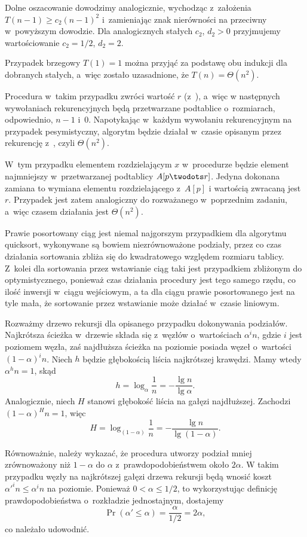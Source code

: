 Dolne oszacowanie dowodzimy analogicznie, wychodząc z~założenia $T(n-1)\ge c_2(n-1)^2$ i~zamieniając znak nierówności na przeciwny w~powyższym dowodzie. Dla analogicznych stałych $c_2$, $d_2>0$ przyjmujemy wartościowanie $c_2=1/2$, $d_2=2$.

Przypadek brzegowy $T(1)=1$ można przyjąć za podstawę obu indukcji dla dobranych stałych, a~więc zostało uzasadnione, że $T(n)=\Theta(n^2)$.

\exercise %
Procedura  w~takim przypadku zwróci wartość $r$ (z~), a~więc w następnych wywołaniach rekurencyjnych będą przetwarzane podtablice o~rozmiarach, odpowiednio, $n-1$ i~0. Napotykając w~każdym wywołaniu rekurencyjnym na przypadek pesymistyczny, algorytm będzie działał w~czasie opisanym przez rekurencję z~, czyli $\Theta(n^2)$.

\exercise %
W~tym przypadku elementem rozdzielającym $x$ w~procedurze  będzie element najmniejszy w~przetwarzanej podtablicy $A[p\twodots r]$. Jedyna dokonana zamiana to wymiana elementu rozdzielającego z~$A[p]$ i wartością zwracaną jest $r$. Przypadek jest zatem analogiczny do rozważanego w~poprzednim zadaniu, a~więc czasem działania  jest $\Theta(n^2)$.

\exercise %
Prawie posortowany ciąg jest niemal najgorszym przypadkiem dla algorytmu quicksort, wykonywane są bowiem niezrównoważone podziały, przez co czas działania sortowania zbliża się do kwadratowego względem rozmiaru tablicy. Z~kolei dla sortowania przez wstawianie ciąg taki jest przypadkiem zbliżonym do optymistycznego, ponieważ czas działania procedury  jest tego samego rzędu, co ilość inwersji w~ciągu wejściowym, a ta dla ciągu prawie posortowanego jest na tyle mała, że sortowanie przez wstawianie może działać w~czasie liniowym.

\exercise %
Rozważmy drzewo rekursji dla opisanego przypadku dokonywania podziałów. Najkrótsza ścieżka w~drzewie składa się z~węzłów o~wartościach $\alpha^in$, gdzie $i$ jest poziomem węzła, zaś najdłuższa ścieżka na  poziomie posiada węzeł o~wartości $(1-\alpha)^in$. Niech $h$ będzie głębokością liścia najkrótszej krawędzi. Mamy wtedy $\alpha^hn=1$, skąd
\[
	h = \log_\alpha\frac{1}{n} = -\frac{\lg n}{\lg\alpha}.
\]
Analogicznie, niech $H$ stanowi głębokość liścia na gałęzi najdłuższej. Zachodzi $(1-\alpha)^Hn=1$, więc
\[
	H = \log_{(1-\alpha)}\frac{1}{n} = -\frac{\lg n}{\lg(1-\alpha)}.
\]

\exercise %
Równoważnie, należy wykazać, że procedura  utworzy podział mniej zrównoważony niż $1-\alpha$ do $\alpha$ z~prawdopodobieństwem około $2\alpha$. W takim przypadku węzły na najkrótszej gałęzi drzewa rekursji będą wnosić koszt $\alpha'^in\le\alpha^in$ na  poziomie. Ponieważ $0<\alpha\le1/2$, to wykorzystując definicję prawdopodobieństwa o~rozkładzie jednostajnym, dostajemy
\[
	\Pr(\alpha'\le\alpha) = \frac{\alpha}{1/2} = 2\alpha,
\]
co należało udowodnić.

